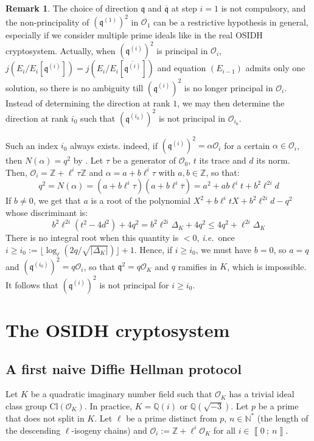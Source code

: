 \documentclass[a4paper,10pt]{report}
\theoremstyle{definition}
\theoremstyle{plain}
\theoremstyle{definition}
\newtheorem{remark}[definition]{Remark}
\newcommand{\ie}{\emph{i.e.}\ }
\newcommand{\N}{\mathbb{N}}
\newcommand{\Z}{\mathbb{Z}}
\newcommand{\Q}{\mathbb{Q}}
\newcommand{\mO}{\mathcal{O}}
\renewcommand{\i}[2]{\left\llbracket #1~;~#2\right\rrbracket}
\renewcommand{\(}{\left(}
\renewcommand{\)}{\right)}
\newcommand{\mfq}{\mathfrak{q}}
\begin{document}
\begin{remark}
The choice of direction $\mfq$ and $\overline{\mfq}$ at step $i=1$ is not compulsory, and the non-principality of $(\mfq^{(1)})^2$ in $\mO_1$ can be a restrictive hypothesis in general, especially if we consider multiple prime ideals like in the real OSIDH cryptosystem. Actually, when $(\mfq^{(i)})^2$ is principal in $\mO_i$, $j(E_i/E_i[\mfq^{(i)}])=j(E_i/E_i[\overline{\mfq^{(i)}}])$ and equation $(E_{i-1})$ admits only one solution, so there is no ambiguity till $(\mfq^{(i)})^2$ is no longer principal in $\mO_i$. Instead of determining the direction at rank $1$, we may then determine the direction at rank $i_0$ such that $(\mfq^{(i_0)})^2$ is not principal in $\mO_{i_0}$. 

Such an index $i_0$ always exists.  indeed, if $(\mfq^{(i)})^2=\alpha\mO_i$ for a certain $\alpha\in\mO_i$, then $N(\alpha)=q^2$ by \cite[lemma 7.14.(i)]{Cox}. Let $\tau$ be a generator of $\mO_0$, $t$ its trace and $d$ its norm. Then,  $\mO_i=\Z+\ell^i\tau\Z$ and $\alpha=a+b\ell^i\tau$ with $a, b\in\Z$, so that:
\[q^2=N(\alpha)=(a+b\ell^i\tau)(a+b\ell^i\overline{\tau})=a^2+ab\ell^it+b^2\ell^{2i}d\]
If $b\neq 0$, we get that $a$ is a root of the polynomial $X^2+b\ell^itX+b^2\ell^{2i}d-q^2$ whose discriminant is:
\[b^2\ell^{2i}(t^2-4d^2)+4q^2=b^2\ell^{2i}\Delta_K+4q^2\leq 4q^2+\ell^{2i}\Delta_K\]
There is no integral root when this quantity is $<0$, \ie once $i\geq i_0:=\lfloor \log_\ell(2q/\sqrt{|\Delta_K|})\rfloor +1$. Hence, if $i\geq i_0$, we must have $b=0$, so $a=q$ and $(\mfq^{(i_0)})^2=q\mO_i$, so that $\mfq^2=q\mO_K$ and $q$ ramifies in $K$, which is impossible. It follows that $(\mfq^{(i)})^2$ is not principal for $i\geq i_0$.
\end{remark}


\chapter{The OSIDH cryptosystem}

\section{A first naive Diffie Hellman protocol}

Let $K$ be a quadratic imaginary number field such that $\mO_K$ has a trivial ideal class group $\mbox{Cl}(\mO_K)$. In practice, $K=\Q(i)$ or $\Q(\sqrt{-3})$. Let $p$ be a prime that does not split in $K$. Let $\ell$ be a prime distinct from $p$, $n\in\N^*$ (the length of the descending $\ell$-isogeny chains) and $\mO_i:=\Z+\ell^i\mO_K$ for all $i\in\i{0}{n}$.
\end{document}

